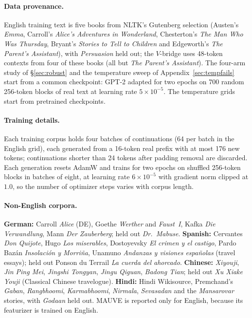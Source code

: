 \documentclass[10pt]{article}
\theoremstyle{plain}
\theoremstyle{definition}
\begin{document}
\paragraph{Data provenance.} English training text is five books from NLTK's Gutenberg selection
(Austen's \emph{Emma}, Carroll's \emph{Alice's Adventures in Wonderland}, Chesterton's \emph{The
Man Who Was Thursday}, Bryant's \emph{Stories to Tell to Children} and Edgeworth's \emph{The
Parent's Assistant}), with \emph{Persuasion} held out; the
$V$-bridge uses 48-token contexts from four of these books (all but \emph{The Parent's Assistant}). The four-arm study of \S\ref{sec:robust} and
the temperature sweep of Appendix~\ref{sec:tempfails} start from a common checkpoint: GPT-2 adapted
for two epochs on 700 random 256-token blocks of real text at learning rate $5\times10^{-5}$. The
temperature grids start from pretrained checkpoints.

\paragraph{Training details.} Each training corpus holds four batches of continuations (64 per
batch in the English grid), each generated from a 16-token real prefix with at most 176 new
tokens; continuations shorter than 24 tokens after padding removal are discarded. Each generation
resets AdamW and trains for two epochs on shuffled 256-token blocks in batches of eight, at
learning rate $6\times10^{-5}$ with gradient norm clipped at $1.0$, so the number of optimizer
steps varies with corpus length.

\paragraph{Non-English corpora.} \textbf{German:} Carroll \emph{Alice} (DE), Goethe \emph{Werther} and \emph{Faust~I}, Kafka \emph{Die Verwandlung}, Mann \emph{Der Zauberberg}; held out \emph{Dr.\ Mabuse}. \textbf{Spanish:} Cervantes \emph{Don Quijote}, Hugo \emph{Los miserables}, Dostoyevsky \emph{El crimen y el castigo}, Pardo Baz\'an \emph{Insolaci\'on y Morri\~na}, Unamuno \emph{Andanzas y visiones espa\~nolas} (travel essays); held out Ponson du Terrail \emph{La cuerda del ahorcado}. \textbf{Chinese:} \emph{Xiyouji}, \emph{Jin Ping Mei}, \emph{Jingshi Tongyan}, \emph{Jingu Qiguan}, \emph{Badong Tian}; held out \emph{Xu Xiake Youji} (Classical Chinese travelogue). \textbf{Hindi:} Hindi Wikisource, Premchand's \emph{Gaban}, \emph{Rangbhoomi}, \emph{Karmabhoomi}, \emph{Nirmala}, \emph{Sevasadan} and the \emph{Mansarovar} stories, with \emph{Godaan} held out. MAUVE is reported only for English, because its featurizer is trained on English.
\end{document}
